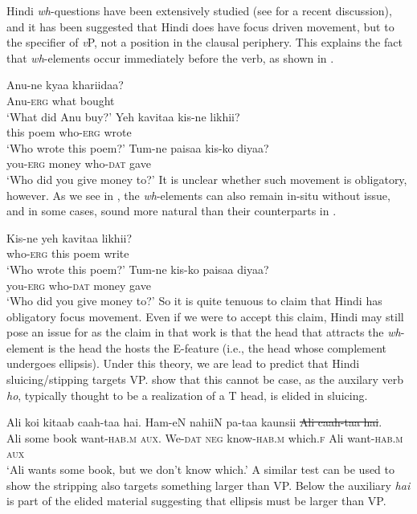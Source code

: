 \documentclass[output=paper]{langscibook}
\begin{document}
Hindi \textit{wh}-questions have been extensively studied (see \citealt{dayal17} for a recent discussion), and it has been suggested that Hindi does have focus driven movement, but to the specifier of \emph{v}P, not a position in the clausal periphery. This explains the fact that \emph{wh}-elements occur immediately before the verb, as shown in .

\ea \label{maex19}
    \ea 
        \gll Anu-ne kyaa khariidaa?\\
        Anu-\textsc{erg} what bought\\
        \glt `What did Anu buy?'
    \ex 
        \gll Yeh kavitaa kis-ne likhii?\\
        this poem who-\textsc{erg} wrote\\
        \glt `Who wrote this poem?'
    \ex 
        \gll Tum-ne paisaa kis-ko diyaa?\\
        you-\textsc{erg} money who-\textsc{dat} gave\\
        \glt `Who did you give money to?'
    \z 
\z 
It is unclear whether such movement is obligatory, however. As we see in , the \textit{wh}-elements can also remain in-situ without issue, and in some cases, sound more natural than their counterparts in .

\ea \label{maex20}
    \ea 
        \gll Kis-ne yeh kavitaa likhii?\\
        who-\textsc{erg} this poem write\\
        \glt `Who wrote this poem?'
    \ex 
        \gll Tum-ne kis-ko paisaa diyaa?\\
        you-\textsc{erg} who-\textsc{dat} money gave\\
        \glt `Who did you give money to?'
    \z 
\z 
So it is quite tenuous to claim that Hindi has obligatory focus movement. Even if we were to accept this claim, Hindi may still pose an issue for \citet{craenenbroeck13} as the claim in that work is that the head that attracts the \emph{wh}-element is the head the hosts the E-feature (i.e., the head whose complement undergoes ellipsis). Under this theory, we are lead to predict that Hindi sluicing/stipping targets VP. \citet{gribanova16} show that this cannot be case, as the auxilary verb \emph{ho}, typically thought to be a realization of a T head, is elided in sluicing.

\ea 
    \gll Ali koi kitaab caah-taa hai. Ham-eN nahiiN pa-taa kaunsii \sout{Ali caah-taa hai}.\\
    Ali some book want-\textsc{hab.m} \textsc{aux}. We-\textsc{dat} \textsc{neg} know-\textsc{hab.m} which.\textsc{f} {Ali want-\textsc{hab.m} \textsc{aux}}\\
    \glt `Ali wants some book, but we don't know which.' \hfill \citep[643]{gribanova16}
\z 
A similar test can be used to show the stripping also targets something larger than VP. Below the auxiliary \emph{hai} is part of the elided material suggesting that ellipsis must be larger than VP. 
\end{document}
